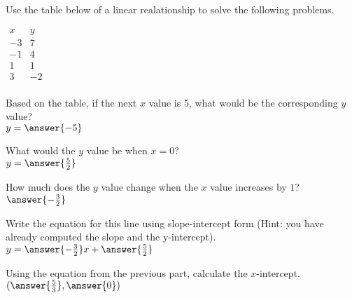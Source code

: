 \documentclass{ximera}
\author{David Kish}
\begin{document}
Use the table below of a linear realationship to solve the following problems.
\begin{center}
$\begin{array}{r|r}
x&y\\
-3&7\\
-1&4\\
1&1\\
3&-2\\
\end{array}$
\end{center}
\begin{exercise}
Based on the table, if the next $x$ value is 5, what would be the corresponding $y$ value?\\
$y =\answer{-5}$
\end{exercise}
\begin{exercise}
What would the $y$ value be when $x=0$?\\
$y=\answer{\frac{5}{2}}$
\end{exercise}
\begin{exercise}
How much does the $y$ value change when the $x$ value increases by $1$?\\
$\answer{-\frac{3}{2}}$
\end{exercise}
\begin{exercise}
Write the equation for this line using slope-intercept form (Hint: you have already computed the slope and the y-intercept).\\
$y=\answer{-\frac{3}{2}}x+\answer{\frac{5}{2}}$
\end{exercise}
\begin{exercise}
Using the equation from the previous part, calculate the $x$-intercept.\\
$(\answer{\frac{5}{3}},\answer{0})$
\end{exercise}
\end{document}
